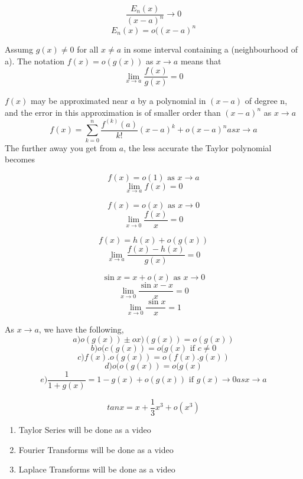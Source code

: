 \documentclass[twoside]{report}
\begin{document}
\[
   \frac{E_n(x)}{(x-a)^n} \rightarrow 0 
\]
\[
	E_n(x) = o((x-a)^n
\]
\begin{definition}
	Assumg $g(x) \neq 0$ for all $x \neq a$ in some interval containing a (neighbourhood of a). The notation $f(x) = o(g(x))$ as $x \rightarrow a$ means that
	\[
	   \lim_{x \rightarrow a} \frac{f(x)}{g(x)} = 0
	\]
\end{definition}
$f(x)$ may be approximated near $a$ by a polynomial in $(x-a)$ of degree n, and the error in this approximation is of smaller order than $(x-a)^n$ as $x \rightarrow a$
\[
   f(x) = \sum_{k=0}^{n} \frac{f^{(k)}(a)}{k!}(x-a)^k + o(x-a)^n as x \rightarrow a
\]
The further away you get from $a$, the less accurate the Taylor polynomial becomes
\begin{example}
	 \[
	    f(x) = o(1) \text{ as } x \rightarrow a
	 \]
	 \[
	    \lim_{x \rightarrow a} f(x) = 0
	 \]
\end{example}
\begin{example}
	 \[
	    f(x) = o (x) \text{ as } x \rightarrow 0 
	 \]
	 \[
	    \lim_{x \rightarrow 0} \frac{f(x)}{x} = 0
	 \]
\end{example}
\begin{example}
	 \[
	 	f(x) = h(x) + o(g(x))
	 \]
	 \[
	    \lim_{x \rightarrow a} \frac{f(x) - h(x)}{g(x)} = 0
	 \]
\end{example}
\begin{example}
	 \[
	    \sin{x} = x + o(x) \text{ as }  x \rightarrow 0 
	 \]
	 \[
	    \lim_{x \rightarrow 0} \frac{\sin{x}- x}{x} = 0
	 \]
	 \[
	    \lim_{x \rightarrow 0} \frac{\sin{x}}{x} = 1
	 \]
\end{example}
\begin{theorem}
   As $x \rightarrow a$, we have the following,
   \[
   	a) o(g(x)) \pm ox)(g(x)) = o(g(x))
     \]
   \[
      b) o(c(g(x)) = o(g(x) \text{ if } c \neq 0
   \]
   \[
   	c) f(x). o(g(x)) = o(f(x).g(x))
   \]
   \[
   	d) o(o(g(x)) = o(g(x)
   \]
   \[
      e) \frac{1}{1+g(x)} = 1 - g(x) + o(g(x)) \text{ if } g(x) \rightarrow 0 as x \rightarrow a
   \]
\end{theorem}
\begin{example}
\[
   tan x = x + \frac{1}{3} x^3 + o(x^3)
\]

\end{example}
\begin{enumerate}
   \item Taylor Series will be done as a video

\item Fourier Transforms will be done as a video

\item Laplace Transforms will be done as a video
\end{enumerate}
\end{document}
